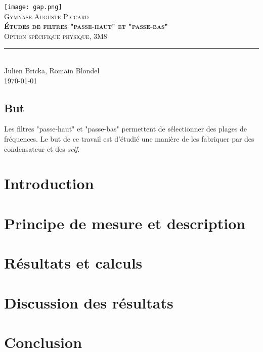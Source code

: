 \documentclass[11pt,titlepage]{article}
\begin{document}
\begin{titlepage}
	\centering
    \texttt{[image: gap.png]}\\[0.25cm] 	%
    \textsc{\LARGE Gymnase Auguste Piccard}\\ \vspace{\fill}
    \textbf{\textsc{\fontsize{40}{40}\selectfont Études de filtres "passe-haut" et "passe-bas"}}\\ \vspace{\fill}		
	\textsc{\LARGE Option spécifique physique, 3M8}\\[0.4cm]
	\rule{\linewidth}{0.2 mm} \\[0.5 cm]
	Julien Bricka, Romain Blondel \\[2cm] \today
\end{titlepage}
\restoregeometry

\thispagestyle{numberonly}
\begin{summary}
\section*{But}
Les filtres "passe-haut" et "passe-bas" permettent de sélectionner des plages de fréquences. Le but de ce travail est d'étudié une manière de les fabriquer par des condensateur et des \textit{self}.

\end{summary}

\section{Introduction}


\section{Principe de mesure et description}


\section{Résultats et calculs}


\section{Discussion des résultats}


\section{Conclusion}

\end{document}
